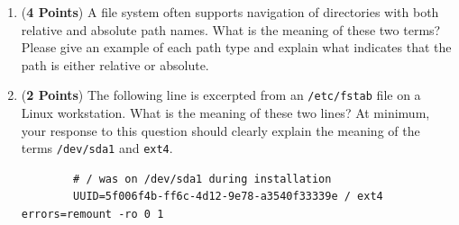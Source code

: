 \documentclass[12pt,epsf,psfig,graphics]{article}
\begin{document}
\begin{enumerate}
\begin{enumerate}
    \item ({\bf 4 Points}) A file system often supports navigation of directories with both relative and absolute path
      names.  What is the meaning of these two terms?  Please give an example of each path type and explain what
      indicates that the path is either relative or absolute.

    \item ({\bf 2 Points})  The following line is excerpted from an {\tt /etc/fstab} file on a Linux workstation.  What
      is the meaning of these two lines? At minimum, your response to this question should clearly explain the meaning
      of the terms {\tt /dev/sda1} and {\tt ext4}. \\

      \hspace*{-.75in}
      \vspace*{1in}
      \begin{minipage}{4in}
        \begin{verbatim}
        # / was on /dev/sda1 during installation
        UUID=5f006f4b-ff6c-4d12-9e78-a3540f33339e / ext4 errors=remount -ro 0 1
        \end{verbatim}
      \end{minipage}

  \end{enumerate}

  \newpage


\end{enumerate}
\end{document}
